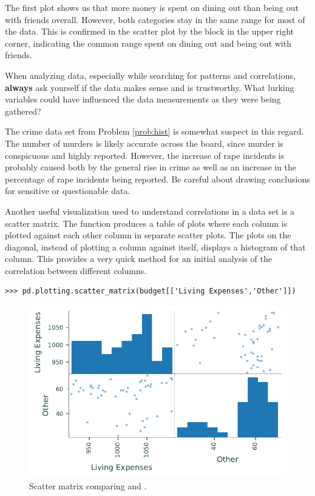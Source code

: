 The first plot shows us that more money is spent on dining out than being out with friends overall.
However, both categories stay in the same range for most of the data.
This is confirmed in the scatter plot by the block in the upper right corner, indicating the common range spent on dining out and being out with friends.

\begin{warn}
When analyzing data, especially while searching for patterns and correlations, \textbf{always} ask yourself if the data makes sense and is trustworthy.
What lurking variables could have influenced the data measurements as they were being gathered?

The crime data set from Problem \ref{prob:hist} is somewhat suspect in this regard.
The number of murders is likely accurate across the board, since murder is conspicuous and highly reported.
However, the increase of rape incidents is probably caused both by the general rise in crime as well as an increase in the percentage of rape incidents being reported.
Be careful about drawing conclusions for sensitive or questionable data.
\end{warn}

Another useful visualization used to understand correlations in a data set is a scatter matrix.
The function  produces a table of plots where each column is plotted against each other column in separate scatter plots.
The plots on the diagonal, instead of plotting a column against itself, displays a histogram of that column.
This provides a very quick method for an initial analysis of the correlation between different columns.

\begin{lstlisting}
>>> pd.plotting.scatter_matrix(budget[['Living Expenses','Other']])
\end{lstlisting}

\begin{figure}[H]
    \includegraphics[width=.7\textwidth]{figures/scatter_table.pdf}
    \caption{Scatter matrix comparing  and .}
\end{figure}



